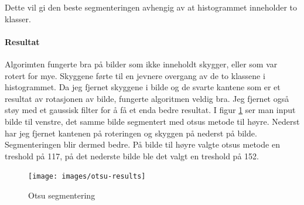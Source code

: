 \documentclass{article}
\begin{document}
Dette vil gi den beste segmenteringen avhengig av at histogrammet inneholder to klasser.

\paragraph{Resultat}
Algorimten fungerte bra på bilder som ikke inneholdt skygger, eller som var rotert for mye. Skyggene førte til en jevnere overgang av de to klassene i histogrammet. Da jeg fjernet skyggene i bilde og de svarte kantene som er et resultat av rotasjonen av bilde, fungerte algoritmen veldig bra. Jeg fjernet også støy med et gaussisk filter for å få et enda bedre resultat. I figur \ref{fig:otsu-results} ser man input bilde til venstre, det samme bilde segmentert med otsus metode til høyre. Nederst har jeg fjernet kantenen på roteringen og skyggen på nederst på bilde. Segmenteringen blir dermed bedre. På bilde til høyre valgte otsus metode en treshold på 117, på det nederste bilde ble det valgt en treshold på 152.

\begin{figure}[h]
\centering
\texttt{[image: images/otsu-results]}
\caption{Otsu segmentering}
\label{fig:otsu-results}
\end{figure}
\end{document}
